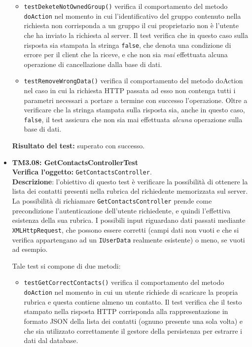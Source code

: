 \begin{itemize}
\begin{itemize}
\item \texttt{testDeketeNotOwnedGroup()} verifica il comportamento del metodo \texttt{doAction} nel momento in cui l'identificativo del gruppo contenuto nella richiesta non corrisponda a un gruppo il cui proprietario non è l'utente che ha inviato la richiesta al server. Il test verifica che in questo caso sulla risposta sia stampata la stringa \texttt{false}, che denota una condizione di errore per il client che la riceve, e che non sia \textit{mai} effettuata alcuna operazione di cancellazione dalla base di dati.

\item \texttt{testRemoveWrongData()} verifica il comportamento del metodo doAction nel caso in cui la richiesta HTTP passata ad esso non contenga tutti i parametri necessari a portare a termine con successo l'operazione. Oltre a verificare che la stringa stampata sulla risposta sia, anche in questo caso, \texttt{false}, il test assicura che non sia mai effettuata \textit{alcuna} operazione sulla base di dati.
\end{itemize}
\textbf{Risultato del test:} superato con successo.


\item \textbf{TM3.08: GetContactsControllerTest}\\
\textbf{Verifica l'oggetto:} \texttt{GetContactsController}.\\
\textbf{Descrizione}: l'obiettivo di questo test è verificare la possibilità di ottenere la lista dei contatti presenti nella rubrica del richiedente memorizzata sul server. La possibilità di richiamare \texttt{GetContactsController} prende come precondizione l'autenticazione dell'utente richiedente, e quindi l'effettiva esistenza della sua rubrica.
I possibili input riguardano dati passati mediante \texttt{XMLHttpRequest}, che possono essere corretti (campi dati non vuoti e che si verifica appartengano ad un \texttt{IUserData} realmente esistente) o meno, se vuoti ad esempio.

Tale test si compone di due metodi:
\begin{itemize}
\item \texttt{testGetCorrectContacts()} verifica il comportamento del metodo \texttt{doAction} nel momento in cui un utente richiede di scaricare la propria rubrica e questa contiene almeno un contatto. Il test verifica che il testo stampato nella risposta HTTP corrisponda alla rappresentazione in formato JSON della lista dei contatti (ognuno presente una sola volta) e che sia utilizzato correttamente il gestore della persistenza per estrarre i dati dal database.


\end{itemize}
\end{itemize}
